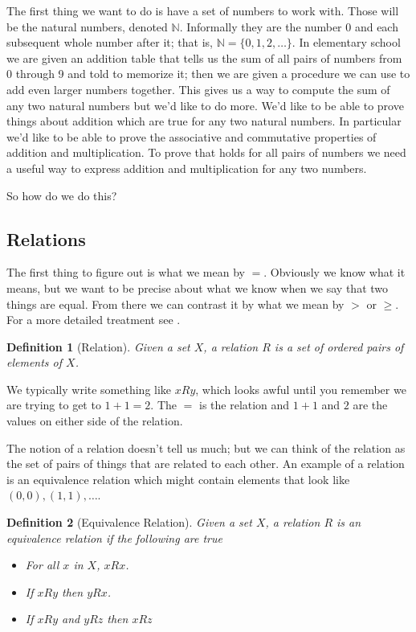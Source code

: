 \documentclass[oneside]{book}
\newtheorem{definition}{Definition}
\newcommand{\set}[1]{\{#1\}}
\begin{document}
\begin{spacing}{1.618}
The first thing we want to do is have a set of numbers to work with.  Those will be the natural numbers, denoted $\mathbb{N}$. Informally they are the number 0 and each subsequent whole number after it; that is, $\mathbb{N}=\set{0, 1, 2, \dots}$. In elementary school we are given an addition table that tells us the sum of all pairs of numbers from 0 through 9 and told to memorize it; then we are given a procedure we can use to add even larger numbers together. This gives us a way to compute the sum of any two natural numbers but we'd like to do more. We'd like to be able to prove things about addition which are true for any two natural numbers. In particular we'd like to be able to prove the associative and commutative properties of addition and multiplication. To prove that holds for all pairs of numbers we need a useful way to express addition and multiplication for any two numbers. 

So how do we do this? 

\subsection{Relations}

The first thing to figure out is what we mean by $=$. Obviously we know what it means, but we want to be precise about what we know when we say that two things are equal. From there we can contrast it by what we mean by $>$ or $\geq$. For a more detailed treatment see \cite{enderton77}. 

\begin{definition}[Relation]
Given a set $X$, a relation $R$ is a set of ordered pairs of elements of $X$. 
\end{definition}

We typically write something like $xRy$, which looks awful until you remember we are trying to get to $1+1=2$. The $=$ is the relation and $1+1$ and $2$ are the values on either side of the relation. 

The notion of a relation doesn't tell us much; but we can think of the relation as the set of pairs of things that are related to each other. An example of a relation is an equivalence relation which might contain elements that look like $(0, 0), (1, 1), \dots$. 

\begin{definition}[Equivalence Relation]
Given a set $X$, a relation $R$ is an equivalence relation if the following are true
\begin{itemize}
	\item For all $x$ in $X$, $xRx$.
	\item If $xRy$ then $yRx$.
	\item If $xRy$ and $yRz$ then $xRz$
\end{itemize}
\end{definition}


\end{spacing}
\end{document}
